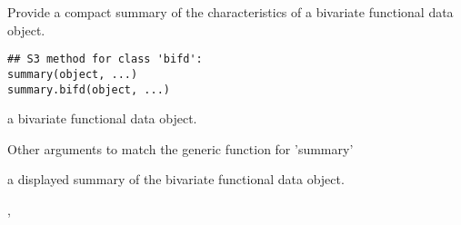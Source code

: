 \begin{Description}\relax
Provide a compact summary of the characteristics of a
bivariate functional data object.
\end{Description}
\begin{Usage}
\begin{verbatim}
## S3 method for class 'bifd':
summary(object, ...)
summary.bifd(object, ...)
\end{verbatim}
\end{Usage}
\begin{Arguments}
\begin{ldescription}
\item[\code{object}] a bivariate functional data object.

\item[\code{...}] Other arguments to match the generic function for 'summary'
\end{ldescription}
\end{Arguments}
\begin{Value}
a displayed summary of the bivariate functional data object.
\end{Value}
\begin{SeeAlso}\relax
{},
\end{SeeAlso}

